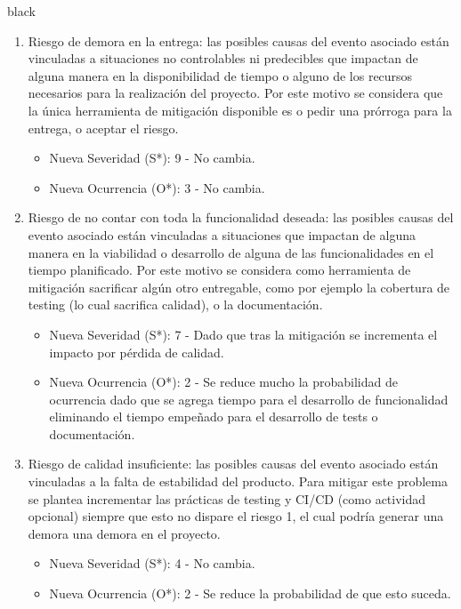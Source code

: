 \documentclass[
11pt, %
]{charter}
\begin{document}
\begin{consigna}{black}
\begin{enumerate}
	\item Riesgo de demora en la entrega: las posibles causas del evento asociado están vinculadas a situaciones no controlables ni predecibles que impactan de alguna manera en la disponibilidad de tiempo o alguno de los recursos necesarios para la realización del proyecto. Por este motivo se considera que la única herramienta de mitigación disponible es o pedir una prórroga para la entrega, o aceptar el riesgo.
	\begin{itemize}
		\item Nueva Severidad (S*): 9 - No cambia.
		\item Nueva Ocurrencia (O*): 3 - No cambia.
	\end{itemize}
	
	\item Riesgo de no contar con toda la funcionalidad deseada: las posibles causas del evento asociado están vinculadas a situaciones que impactan de alguna manera en la viabilidad o desarrollo de alguna de las funcionalidades en el tiempo planificado. Por este motivo se considera como herramienta de mitigación sacrificar algún otro entregable, como por ejemplo la cobertura de testing (lo cual sacrifica calidad), o la documentación.
	\begin{itemize}
		\item Nueva Severidad (S*): 7 - Dado que tras la mitigación se incrementa el impacto por pérdida de calidad.
		\item Nueva Ocurrencia (O*): 2 - Se reduce mucho la probabilidad de ocurrencia dado que se agrega tiempo para el desarrollo de funcionalidad eliminando el tiempo empeñado para el desarrollo de tests o documentación.
	\end{itemize}
	
	
	\item Riesgo de calidad insuficiente: las posibles causas del evento asociado están vinculadas a la falta de estabilidad del producto. Para mitigar este problema se plantea incrementar las prácticas de testing y CI/CD (como actividad opcional) siempre que esto no dispare el riesgo 1, el cual podría generar una demora una demora en el proyecto.
	\begin{itemize}
		\item Nueva Severidad (S*): 4 - No cambia.
		\item Nueva Ocurrencia (O*): 2 - Se reduce la probabilidad de que esto suceda.
	\end{itemize}	
	

\end{enumerate}
\end{consigna}
\end{document}
